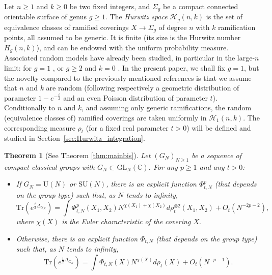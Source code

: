 \documentclass[11pt,a4paper,reqno]{article}
\newtheorem{theorem}{Theorem}[section]
\theoremstyle{definition}
\theoremstyle{remark}
\newcommand\SU{{\mathrm{SU}}}
\newcommand\GL{{\mathrm{GL}}}
\newcommand\U{{\mathrm U}}
\newcommand\C{\mathbb{C}}
\newcommand\Tr{\mathrm{Tr}}
\begin{document}
Let $n\geq 1$ and $k\geq 0$ be two fixed integers, and $\Sigma_g$ be a compact connected orientable surface of genus $g\geq 1$. The \emph{Hurwitz space} $\mathcal{H}_g(n,k)$ is the set of equivalence classes of ramified coverings $X\to\Sigma_g$ of degree $n$ with $k$ ramification points, all assumed to be generic. It is finite (its size is the Hurwitz number $H_g(n,k)$), and can be endowed with the uniform probability measure. Associated random models have already been studied, in particular in the large-$n$ limit: for $g=1$ \cite{EO,Agg}, or $g\geq 2$ and $k=0$ \cite{MNP,MagPud}. In the present paper, we shall fix $g=1$, but the novelty compared to the previously mentioned references is that we assume that $n$ and $k$ are random (following respectively a geometric distribution of parameter $1-e^{-\frac{t}{2}}$ and an even Poisson distribution of parameter $t$). Conditionally to $n$ and $k$, and assuming only generic ramifications, the random (equivalence classes of) ramified coverings are taken uniformly in $\mathcal{H}_1(n,k)$. The corresponding measure $\rho_t$ (for a fixed real parameter $t>0$) will be defined and studied in Section~\ref{sec:Hurwitz_integration}.

\begin{theorem}[See Theorem \ref{thm:mainbis}]\label{thm:main}
Let $(G_N)_{N\geq 1}$ be a sequence of compact classical groups with $G_N\subset\GL_N(\C)$. For any $p\geq 1$ and any $t>0$:
\begin{itemize}
\item If $G_N=\U(N)$ or $\SU(N)$, there is an explicit function $\Phi_{t,N}^p$ (that depends on the group type) such that, as $N$ tends to infinity,
\begin{equation}
\Tr(e^{\frac{t}{2}\Delta_{G_N}})=\int \Phi_{t,N}^{p}(X_1,X_2)N^{\chi(X_1)+\chi(X_2)}d\rho_t^{\otimes 2}(X_1,X_2)+O_t(N^{-2p-2}),
\end{equation}
where $\chi(X)$ is the Euler characteristic of the covering $X.$
\item Otherwise, there is an explicit function $\Phi_{t,N}$ (that depends on the group type) such that, as $N$ tends to infinity,
\begin{equation}
\Tr(e^{\frac{t}{2}\Delta_{G_N}})=\int \Phi_{t,N}(X)N^{\chi(X)}d\rho_t(X)+O_t(N^{-p-1}).
\end{equation}
\end{itemize}
\end{theorem}
\end{document}
